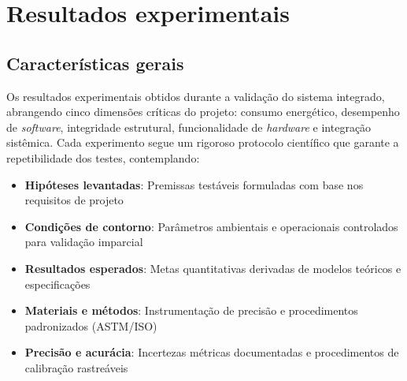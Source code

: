 \chapter{Resultados experimentais}



\section{Características gerais}

Os resultados experimentais obtidos durante a validação do sistema integrado, abrangendo cinco dimensões críticas do projeto: consumo energético, desempenho de \textit{software}, integridade estrutural, funcionalidade de \textit{hardware} e integração sistêmica. Cada experimento segue um rigoroso protocolo científico que garante a repetibilidade dos testes, contemplando:

\begin{itemize}
    \item \textbf{Hipóteses levantadas}: Premissas testáveis formuladas com base nos requisitos de projeto
    \item \textbf{Condições de contorno}: Parâmetros ambientais e operacionais controlados para validação imparcial
    \item \textbf{Resultados esperados}: Metas quantitativas derivadas de modelos teóricos e especificações
    \item \textbf{Materiais e métodos}: Instrumentação de precisão e procedimentos padronizados (ASTM/ISO)
    \item \textbf{Precisão e acurácia}: Incertezas métricas documentadas e procedimentos de calibração rastreáveis
\end{itemize}

